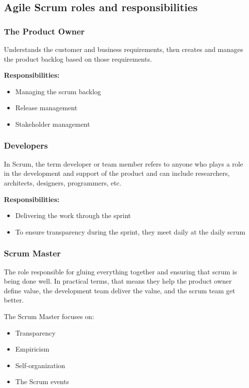 \subsection{Agile Scrum roles and responsibilities}

\subsubsection{The Product Owner}

Understands the customer and business requirements, then creates and manages the product backlog based on those requirements.

\textbf{Responsibilities:}
\begin{itemize}
    \item Managing the scrum backlog
    \item Release management
    \item Stakeholder management
\end{itemize}

\subsubsection{Developers}

In Scrum, the term developer or team member refers to anyone who plays a role in the development and support of the product and can include researchers, architects, designers, programmers, etc.

\textbf{Responsibilities:}
\begin{itemize}
    \item Delivering the work through the sprint
    \item To ensure transparency during the sprint, they meet daily at the daily scrum
\end{itemize}

\subsubsection{Scrum Master}

The role responsible for gluing everything together and ensuring that scrum is being done well. In practical terms, that means they help the product owner define value, the development team deliver the value, and the scrum team get better.

The Scrum Master focuses on:
\begin{itemize}
    \item Transparency
    \item Empiricism
    \item Self-organization
    \item The Scrum events
\end{itemize}

